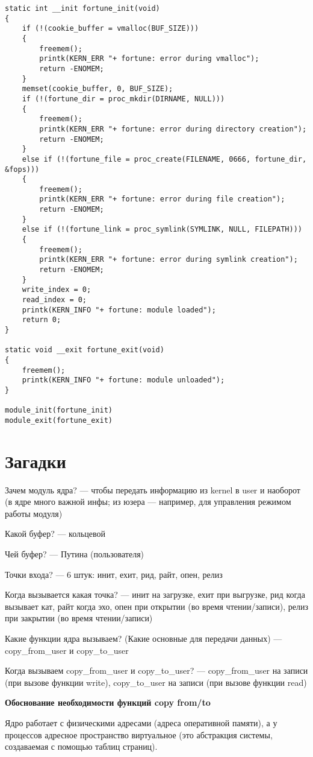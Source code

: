 \begin{lstlisting}
static int __init fortune_init(void) 
{
	if (!(cookie_buffer = vmalloc(BUF_SIZE))) 
	{
		freemem();
		printk(KERN_ERR "+ fortune: error during vmalloc");
		return -ENOMEM;
	}
	memset(cookie_buffer, 0, BUF_SIZE);
	if (!(fortune_dir = proc_mkdir(DIRNAME, NULL))) 
	{
		freemem();
		printk(KERN_ERR "+ fortune: error during directory creation");
		return -ENOMEM;
	} 
	else if (!(fortune_file = proc_create(FILENAME, 0666, fortune_dir, &fops))) 
	{
		freemem();
		printk(KERN_ERR "+ fortune: error during file creation");
		return -ENOMEM;
	} 
	else if (!(fortune_link = proc_symlink(SYMLINK, NULL, FILEPATH))) 
	{
		freemem();
		printk(KERN_ERR "+ fortune: error during symlink creation");
		return -ENOMEM;
	}
	write_index = 0;
	read_index = 0;
	printk(KERN_INFO "+ fortune: module loaded");
	return 0;
}

static void __exit fortune_exit(void) 
{
	freemem();
	printk(KERN_INFO "+ fortune: module unloaded");
}

module_init(fortune_init) 
module_exit(fortune_exit)
\end{lstlisting}

\section*{Загадки}

Зачем модуль ядра? --- чтобы передать информацию из kernel в user и наоборот (в ядре много важной инфы; из юзера --- например, для управления режимом работы модуля)

Какой буфер? --- кольцевой

Чей буфер? --- Путина (пользователя)

Точки входа? --- 6 штук: инит, ехит, рид, райт, опен, релиз

Когда вызывается какая точка? --- инит на загрузке, ехит при выгрузке, рид когда вызывает кат, райт когда эхо, опен при открытии (во время чтении/записи), релиз при закрытии (во время чтении/записи)

Какие функции ядра вызываем? (Какие основные для передачи данных) --- copy\_from\_user и copy\_to\_user

Когда вызываем copy\_from\_user и copy\_to\_user? --- copy\_from\_user на записи (при вызове функции write), copy\_to\_user на записи (при вызове функции read)

\textbf{Обоснование необходимости функций copy from/to}

Ядро работает с физическими адресами (адреса оперативной памяти), а у процессов адресное пространство виртуальное (это абстракция системы, создаваемая с помощью таблиц страниц).

